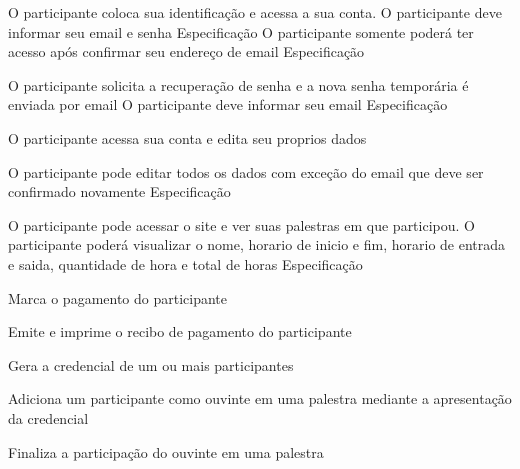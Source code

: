 \documentclass[12pt,a4paper]{article}
\begin{document}
        	{O participante coloca sua identificação e acessa a sua conta.}
        	{%
	        	  {O participante deve informar seu email e senha}
	        	  {Especificação}{}{}%
	        	  {O participante somente poderá ter acesso após confirmar seu endereço de email}
	        	  {Especificação}{}{}%
        	}
			
									
        	{O participante solicita a recuperação de senha e a nova senha temporária é enviada por email}
        	{%
	        	  {O participante deve informar seu email}
	        	  {Especificação}{}{}%
        	}
			
        	{O participante acessa sua conta e edita seu proprios dados}
        	{%
	        	  {O participante pode editar todos os dados com exceção do email que deve ser confirmado novamente}
	        	  {Especificação}{}{}%
        	
        	}
			
        	{O participante pode acessar o site e ver suas palestras em que participou.}
        	{%
					{O participante poderá visualizar o nome, horario de inicio e fim, horario de entrada e saida, quantidade de hora e total de horas}
					{Especificação}{}{}%
        	}
									
        	{Marca o pagamento do participante}
        	{%
        	
        	}
			
        	{Emite e imprime o recibo de pagamento do participante}
        	{%
        	
        	}
			
        	{Gera a credencial de um ou mais participantes}
        	{%
        	
        	}
			
        	{Adiciona um participante como ouvinte em uma palestra mediante a apresentação da credencial}
        	{%
        	
        	}
        	{Finaliza a participação do ouvinte em uma palestra}
        	{%
        	
        	}
			
\end{document}
